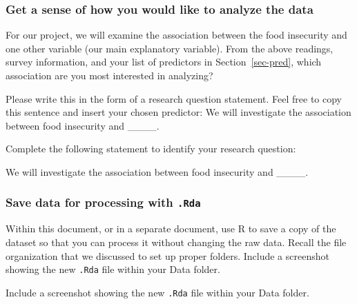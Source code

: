 \documentclass[
  letterpaper,
  DIV=11,
  numbers=noendperiod]{scrartcl}
\begin{document}
\subsubsection{Get a sense of how you would like to analyze the
data}\label{get-a-sense-of-how-you-would-like-to-analyze-the-data}

For our project, we will examine the association between the food
insecurity and one other variable (our main explanatory variable). From
the above readings, survey information, and your list of predictors in
Section~\ref{sec-pred}, which association are you most interested in
analyzing?

Please write this in the form of a research question statement. Feel
free to copy this sentence and insert your chosen predictor: We will
investigate the association between food insecurity and \_\_\_\_.

\begin{tcolorbox}[enhanced jigsaw, toptitle=1mm, toprule=.15mm, leftrule=.75mm, bottomtitle=1mm, breakable, opacityback=0, titlerule=0mm, title=\textcolor{quarto-callout-important-color}{\faExclamation}\hspace{0.5em}{Task}, arc=.35mm, colback=white, rightrule=.15mm, left=2mm, colbacktitle=quarto-callout-important-color!10!white, coltitle=black, opacitybacktitle=0.6, colframe=quarto-callout-important-color-frame, bottomrule=.15mm]

Complete the following statement to identify your research question:

We will investigate the association between food insecurity and
\_\_\_\_.

\end{tcolorbox}

\subsubsection{\texorpdfstring{Save data for processing with
\texttt{.Rda}}{Save data for processing with .Rda}}\label{save-data-for-processing-with-.rda}

Within this document, or in a separate document, use R to save a copy of
the dataset so that you can process it without changing the raw data.
Recall the file organization that we discussed to set up proper folders.
Include a screenshot showing the new \texttt{.Rda} file within your Data
folder.

\begin{tcolorbox}[enhanced jigsaw, toptitle=1mm, toprule=.15mm, leftrule=.75mm, bottomtitle=1mm, breakable, opacityback=0, titlerule=0mm, title=\textcolor{quarto-callout-important-color}{\faExclamation}\hspace{0.5em}{Task}, arc=.35mm, colback=white, rightrule=.15mm, left=2mm, colbacktitle=quarto-callout-important-color!10!white, coltitle=black, opacitybacktitle=0.6, colframe=quarto-callout-important-color-frame, bottomrule=.15mm]

Include a screenshot showing the new \texttt{.Rda} file within your Data
folder.

\end{tcolorbox}
\end{document}

